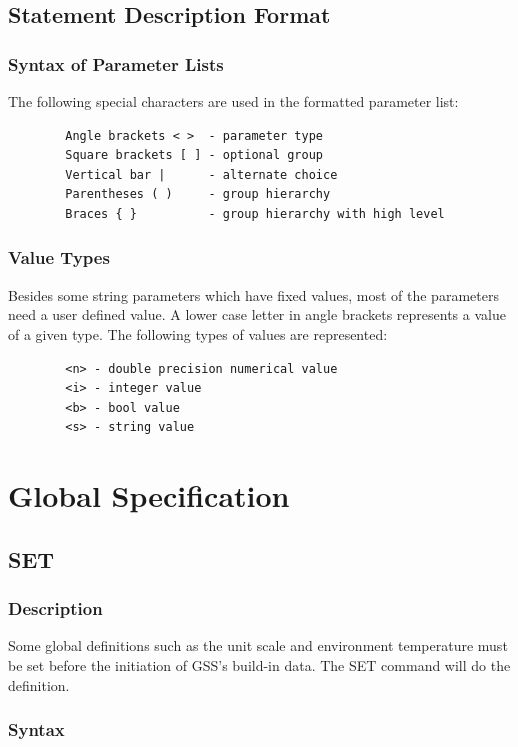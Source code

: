 \documentclass[11pt,pdftex]{article}
\begin{document}
\subsection{Statement Description Format}
\subsubsection*{Syntax of Parameter Lists}
The following special characters are used in the formatted parameter
list:
\begin{verbatim}
        Angle brackets < >  - parameter type
        Square brackets [ ] - optional group
        Vertical bar |      - alternate choice
        Parentheses ( )     - group hierarchy
        Braces { }          - group hierarchy with high level
\end{verbatim}

\subsubsection*{Value Types}
Besides some string parameters which have fixed values, most of the
parameters need a user defined value. A lower case letter in angle
brackets represents a value of a given type. The following types of
values are represented:
\begin{verbatim}
        <n> - double precision numerical value
        <i> - integer value
        <b> - bool value
        <s> - string value
\end{verbatim}



\newpage
\section{Global Specification}
\subsection{SET}
\subsubsection*{Description} Some global definitions such as the unit scale
and environment temperature must be set before the initiation of
GSS's build-in data. The \textsf{SET} command will do the
definition.

\subsubsection*{Syntax}
\end{document}

